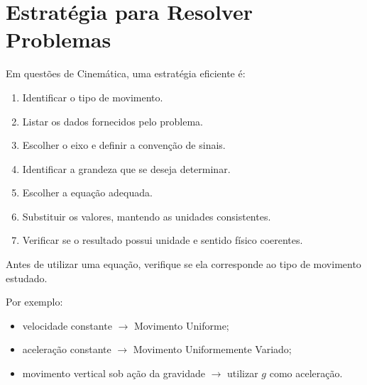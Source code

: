 \documentclass[a4paper,12pt]{article}
\begin{document}

\section{Estratégia para Resolver Problemas}

Em questões de Cinemática, uma estratégia eficiente é:

\begin{enumerate}

    \item Identificar o tipo de movimento.

    \item Listar os dados fornecidos pelo problema.

    \item Escolher o eixo e definir a convenção de sinais.

    \item Identificar a grandeza que se deseja determinar.

    \item Escolher a equação adequada.

    \item Substituir os valores, mantendo as unidades consistentes.

    \item Verificar se o resultado possui unidade e sentido físico
    coerentes.

\end{enumerate}

\begin{atencao}

Antes de utilizar uma equação, verifique se ela corresponde ao tipo
de movimento estudado.

Por exemplo:

\begin{itemize}

    \item velocidade constante
    \(\rightarrow\) Movimento Uniforme;

    \item aceleração constante
    \(\rightarrow\) Movimento Uniformemente Variado;

    \item movimento vertical sob ação da gravidade
    \(\rightarrow\) utilizar \(g\) como aceleração.

\end{itemize}

\end{atencao}
\end{document}
